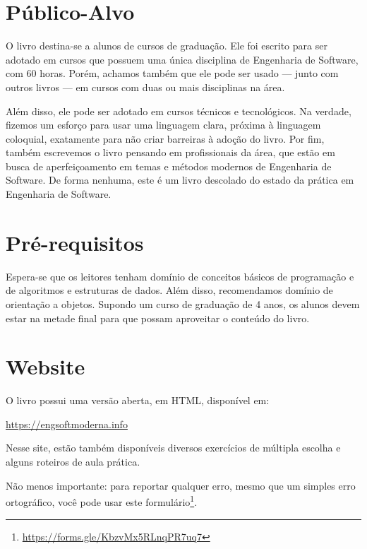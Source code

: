 \documentclass[
  11pt,
  twoside]{book}
\DeclareRobustCommand{\href}[2]{#2\footnote{\url{#1}}}
\begin{document}
\hypertarget{puxfablico-alvo}{%
\section*{Público-Alvo}\label{puxfablico-alvo}}

O livro destina-se a alunos de cursos de graduação. Ele foi escrito para
ser adotado em cursos que possuem uma única disciplina de Engenharia de
Software, com 60 horas. Porém, achamos também que ele pode ser usado ---
junto com outros livros --- em cursos com duas ou mais disciplinas na
área.

Além disso, ele pode ser adotado em cursos técnicos e tecnológicos. Na
verdade, fizemos um esforço para usar uma linguagem clara, próxima à
linguagem coloquial, exatamente para não criar barreiras à adoção do
livro. Por fim, também escrevemos o livro pensando em profissionais da
área, que estão em busca de aperfeiçoamento em temas e métodos modernos
de Engenharia de Software. De forma nenhuma, este é um livro descolado
do estado da prática em Engenharia de Software.

\hypertarget{pruxe9-requisitos}{%
\section*{Pré-requisitos}\label{pruxe9-requisitos}}

Espera-se que os leitores tenham domínio de conceitos básicos de
programação e de algoritmos e estruturas de dados. Além disso,
recomendamos domínio de orientação a objetos. Supondo um curso de
graduação de 4 anos, os alunos devem estar na metade final para que
possam aproveitar o conteúdo do livro.

\hypertarget{website}{%
\section*{Website}\label{website}}

O livro possui uma versão aberta, em HTML, disponível em:

\url{https://engsoftmoderna.info}

Nesse site, estão também disponíveis diversos exercícios de múltipla
escolha e alguns roteiros de aula prática.

Não menos importante: para reportar qualquer erro, mesmo que um simples
erro ortográfico, você pode usar este
\href{https://forms.gle/KbzvMx5RLnqPR7uq7}{formulário}.
\end{document}

